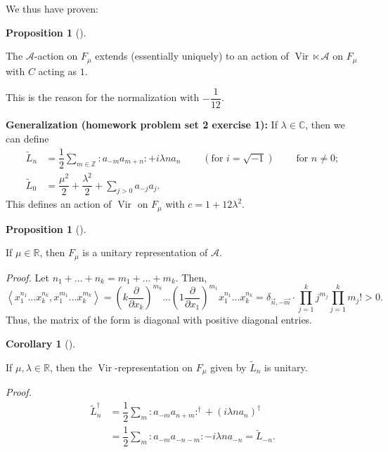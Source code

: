 \documentclass
[numbers=enddot,12pt,final,onecolumn,german,notitlepage]{scrartcl}%
\theoremstyle{definition}
\newtheorem{prop}[theo]{Proposition}
\newenvironment{proposition}[1][]
{\begin{prop}[#1]\begin{leftbar}}
{\end{leftbar}\end{prop}}
\newtheorem{coro}[theo]{Corollary}
\newenvironment{corollary}[1][]
{\begin{coro}[#1]\begin{leftbar}}
{\end{leftbar}\end{coro}}
\begin{document}
We thus have proven:

\begin{proposition}
The $\mathcal{A}$-action on $F_{\mu}$ extends (essentially uniquely) to an
action of $\operatorname*{Vir}\ltimes\mathcal{A}$ on $F_{\mu}$ with $C$ acting
as $1$.
\end{proposition}

This is the reason for the normalization with $-\dfrac{1}{12}$.

\textbf{Generalization (homework problem set 2 exercise 1):} If $\lambda
\in\mathbb{C}$, then we can define%
\begin{align*}
\widetilde{L}_{n}  &  =\dfrac{1}{2}\sum\limits_{m\in\mathbb{Z}}:a_{-m}%
a_{m+n}:+i\lambda na_{n}\ \ \ \ \ \ \ \ \ \ \left(  \text{for }i=\sqrt
{-1}\right)  \ \ \ \ \ \ \ \ \ \ \text{for }n\neq0;\\
\widetilde{L}_{0}  &  =\dfrac{\mu^{2}}{2}+\dfrac{\lambda^{2}}{2}%
+\sum\limits_{j>0}a_{-j}a_{j}.
\end{align*}
This defines an action of $\operatorname*{Vir}$ on $F_{\mu}$ with
$c=1+12\lambda^{2}$.

\begin{proposition}
If $\mu\in\mathbb{R}$, then $F_{\mu}$ is a unitary representation of
$\mathcal{A}$.
\end{proposition}

\textit{Proof.} Let $n_{1}+...+n_{k}=m_{1}+...+m_{k}$. Then,%
\[
\left\langle x_{1}^{n_{1}}...x_{k}^{n_{k}},x_{1}^{m_{1}}...x_{k}^{m_{k}%
}\right\rangle =\left(  k\dfrac{\partial}{\partial x_{k}}\right)  ^{m_{k}%
}...\left(  1\dfrac{\partial}{\partial x_{1}}\right)  ^{m_{1}}x_{1}^{n_{1}%
}...x_{k}^{n_{k}}=\delta_{\overrightarrow{n},-\overrightarrow{m}}\cdot
\prod\limits_{j=1}^{k}j^{m_{j}}\prod\limits_{j=1}^{k}m_{j}!>0.
\]
Thus, the matrix of the form is diagonal with positive diagonal entries.

\begin{corollary}
If $\mu,\lambda\in\mathbb{R}$, then the $\operatorname*{Vir}$-representation
on $F_{\mu}$ given by $\widetilde{L}_{n}$ is unitary.
\end{corollary}

\textit{Proof.}
\begin{align*}
\widetilde{L}_{n}^{\dag}  &  =\dfrac{1}{2}\sum\limits_{m}:a_{-m}a_{n+m}%
:^{\dag}+\left(  i\lambda na_{n}\right)  ^{\dag}\\
&  =\dfrac{1}{2}\sum\limits_{m}:a_{-m}a_{-n-m}:-i\lambda na_{-n}%
=\widetilde{L}_{-n}.
\end{align*}
\end{document}
